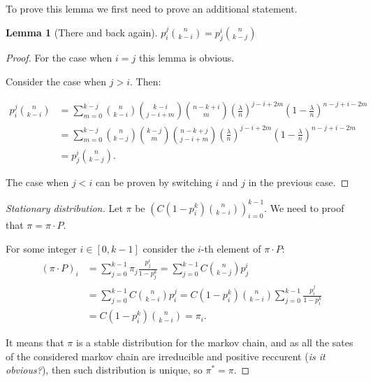 \documentclass{article}
\newtheorem{lemma}{Lemma}
\begin{document}
To prove this lemma we first need to prove an additional statement.

\begin{lemma}[There and back again]
$p_i^j \binom{n}{k - i} = p_j^i \binom{n}{k - j}$
\end{lemma}

\begin{proof}
For the case when $i = j$ this lemma is obvious.

Consider the case when $j > i.$ Then:

\begin{align*}
  p_i^j \binom{n}{k - i} &= \sum\limits_{m = 0}^{k - j} \binom{n}{k - i} \binom{k - i}{j - i + m} \binom{n - k + i}{m} \left(\frac{\lambda}{n}\right)^{j - i + 2m} \left(1 - \frac{\lambda}{n}\right)^{n - j + i - 2m} \\
  &= \sum\limits_{m = 0}^{k - j} \binom{n}{k - j} \binom{k - j}{m} \binom{n - k + j}{j - i + m} \left(\frac{\lambda}{n}\right)^{j - i + 2m} \left(1 - \frac{\lambda}{n}\right)^{n - j + i - 2m} \\
  &= p_j^i \binom{n}{k - j}.
\end{align*}

The case when $j < i$ can be proven by switching $i$ and $j$ in the previous case.
\end{proof}

\begin{proof}[Stationary distribution]
Let $\pi$ be $\left(C (1 - p_i^k) \binom{n}{k - i}\right)_{i = 0}^{k - 1}$. We need to proof that $\pi = \pi \cdot P.$

For some integer $i \in [0, k - 1]$ consider the $i$-th element of $\pi \cdot P$:
\begin{align*}
(\pi \cdot P)_i &= \sum\limits_{j = 0}^{k - 1} \pi_j \frac{p_j^i}{1 - p_j^k} = \sum\limits_{j = 0}^{k - 1} C \binom{n}{k - j} p_j^i \\
&= \sum\limits_{j = 0}^{k - 1} C \binom{n}{k - i} p_i^j = C (1 - p_i^k) \binom{n}{k - i} \sum\limits_{j = 0}^{k - 1} \frac{p_i^j}{1 - p_i^k} \\
&= C (1 - p_i^k) \binom{n}{k - i} = \pi_i.
\end{align*}

It means that $\pi$ is a stable distribution for the markov chain, and as all the sates of the considered markov chain are irreducible and positive reccurent (\textit{is it obvious?}), then such distribution is unique, so $\pi^* = \pi$.
\end{proof}
\end{document}
